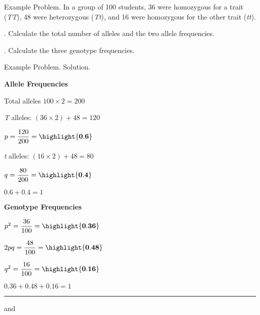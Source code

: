 \documentclass[t]{beamer}
\begin{document}
\begin{frame}{Example Problem. }
	\hangpara In a group of 100 students, 36 were homozygous for a trait (\emph{TT}), 48 were heterozygous (\emph{Tt}), and 16 were homozygous for the other trait (\emph{tt}).

	. Calculate the total number of alleles and the two allele frequencies.

	. Calculate the three genotype frequencies.

\end{frame}
%
{
\begin{frame}{Example Problem. Solution.}
\begin{multicols}{2}

	\hangpara \textbf{Allele Frequencies}
	
	\hangpara Total alleles $100 \times 2 = 200$
	
	\hangpara \emph{T} alleles: $(36 \times 2) + 48 = 120$
	
	\hangpara $p = \dfrac{120}{200} = \highlight{\mathbf{0.6}}$

	\hangpara \emph{t} alleles: $(16 \times 2) + 48 = 80$ 

	\hangpara $q = \dfrac{80}{200} = \highlight{\mathbf{0.4}}$
	
	\hangpara $0.6 + 0.4 = 1$ \checkmark

\columnbreak

	\hangpara \textbf{Genotype Frequencies}
	
	\hangpara $p^2=  \dfrac{36}{100} =\highlight{\mathbf{0.36}}$  

	\hangpara $2pq = \dfrac{48}{100} = \highlight{\mathbf{0.48}}$

	\hangpara $q^2 = \dfrac{16}{100} = \highlight{\mathbf{0.16}}$

	\hangpara $0.36 + 0.48 + 0.16 = 1$ \checkmark
	
	\rule{0.4\textwidth}{0.1pt}\vspace{-0.5\baselineskip}
	
	\hangpara {} and
	

\end{multicols}

\end{frame}
}
\end{document}
